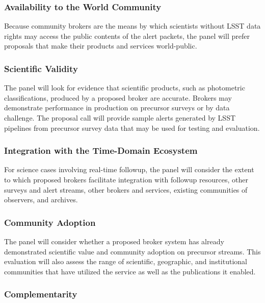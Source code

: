 \subsubsection{Availability to the World Community}

Because community brokers are the means by which scientists without LSST data rights may access the public contents of the alert packets, the panel will prefer proposals that make their products and services world-public.

\subsubsection{Scientific Validity}

The panel will look for evidence that scientific products, such as photometric classifications, produced by a proposed broker are accurate.
Brokers may demonstrate performance in production on precursor surveys or by data challenge.
The proposal call will provide sample alerts generated by LSST pipelines from precursor survey data that may be used for testing and evaluation.

\subsubsection{Integration with the Time-Domain Ecosystem}

For science cases involving real-time followup, the panel will consider the extent to which proposed brokers facilitate integration with followup resources, other surveys and alert streams, other brokers and services, existing communities of observers, and archives.


\subsubsection{Community Adoption}

The panel will consider whether a proposed broker system has already demonstrated scientific value and community adoption on precursor streams.
This evaluation will also assess the
range of scientific, geographic, and institutional communities that have utilized the service as well as the publications it enabled.


\subsubsection{Complementarity}

